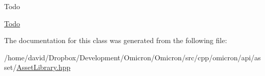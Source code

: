 \begin{DoxyRefDesc}{Todo}
\item[\hyperlink{todo__todo000001}{Todo}]\end{DoxyRefDesc}


The documentation for this class was generated from the following file\+:\begin{DoxyCompactItemize}
\item 
/home/david/\+Dropbox/\+Development/\+Omicron/\+Omicron/src/cpp/omicron/api/asset/\hyperlink{_asset_library_8hpp}{Asset\+Library.\+hpp}\end{DoxyCompactItemize}
